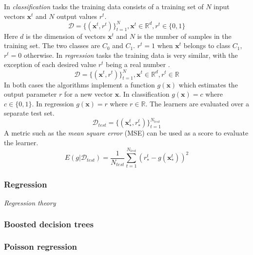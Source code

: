 \documentclass[english,12pt,a4paper,pdftex,sci,utf8]{aaltothesis}
\newcommand{\nyi}[1]{\colorbox{nyibg}{\textcolor{nyitext}{\emph{#1}}}}
\begin{document}
In \emph{classification} tasks the training data consists of a training set of $N$ input vectors $\mathbf{x}^t$ and $N$ output values $r^t$.
$$\mathcal{D} = \{(\mathbf{x}^t, r^t)\}_{t=1}^N, \mathbf{x}^t \in \mathbb{R}^d, r^t \in \{0, 1\} $$
Here $d$ is the dimension of vectors $\mathbf{x}^t$ and $N$ is the number of samples in the training set.
The two classes are $C_0$ and $C_1$. $r^t = 1$ when $\mathbf{x}^t$ belongs to class $C_1$, $r^t = 0$ otherwise. \cite{alpaydin}
In \emph{regression} tasks the training data is very similar, with the exception of each desired value $r^t$ being a real number \cite{alpaydin}.
$$\mathcal{D} = \{(\mathbf{x}^t, r^t)\}_{t=1}^N, \mathbf{x}^t \in \mathbb{R}^d, r^t \in \mathbb{R}$$
In both cases the algorithms implement a function $g(\mathbf{x})$ which estimates the output parameter $r$ for a new vector $\mathbf{x}$. 
In classification $g(\mathbf{x}) = c$ where $c \in \{0, 1\}$. 
In regression $g(\mathbf{x}) = r$ where $r \in \mathbb{R}$.
The learners are evaluated over a separate test set.
$$\mathcal{D}_{test} = \{ (\mathbf{x}_*^t , r_*^t) \}_{t=1}^{N_{test}}$$
A metric such as the \emph{mean square error} (MSE) can be used as a score to evaluate the learner. \cite{alpaydin}
$$E(g | \mathcal{D}_{test}) = \frac{1}{N_{test}} \sum_{t=1}^{N_{test}} (r_*^t - g(\mathbf{x}_*^t))^2$$

\subsubsection{Regression}

\nyi{Regression theory}


\subsubsection{Boosted decision trees}




\subsubsection{Poisson regression}



\end{document}
